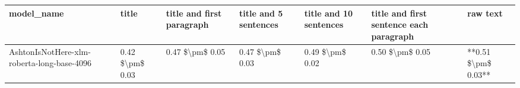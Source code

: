 \begin{tabular}{lllllll}
\toprule
                                model\_name &           title & title and first paragraph & title and 5 sentences & title and 10 sentences & title and first sentence each paragraph &            raw text \\
\midrule
AshtonIsNotHere-xlm-roberta-long-base-4096 & 0.42 \$\textbackslash pm\$ 0.03 &           0.47 \$\textbackslash pm\$ 0.05 &       0.47 \$\textbackslash pm\$ 0.03 &        0.49 \$\textbackslash pm\$ 0.02 &                         0.50 \$\textbackslash pm\$ 0.05 & **0.51 \$\textbackslash pm\$ 0.03** \\
\bottomrule
\end{tabular}
